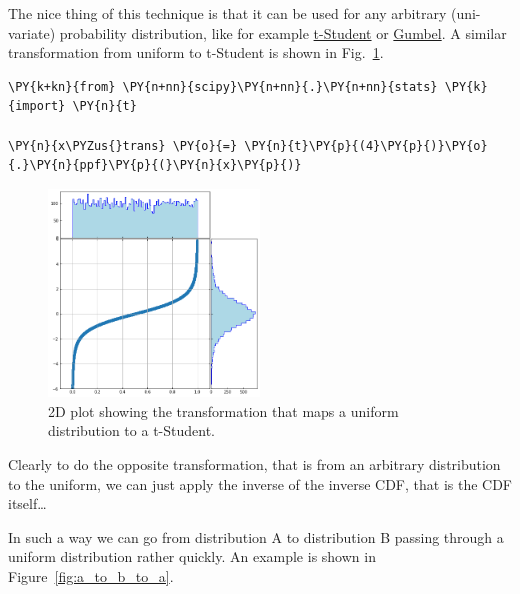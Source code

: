 The nice thing of this technique is that it can be used
for any arbitrary (uni-variate) probability distribution, like for
example \href{https://en.wikipedia.org/wiki/Student\%27s\_t-distribution}{t-Student}
or \href{https://en.wikipedia.org/wiki/Gumbel_distribution}{Gumbel}.
A similar transformation from uniform to t-Student is shown in Fig.~\ref{fig:uniform_to_tstudent}.

\begin{tcolorbox}[breakable, size=fbox, boxrule=1pt, pad at break*=1mm,colback=cellbackground, colframe=cellborder]
\begin{Verbatim}[commandchars=\\\{\}]
\PY{k+kn}{from} \PY{n+nn}{scipy}\PY{n+nn}{.}\PY{n+nn}{stats} \PY{k}{import} \PY{n}{t}

\PY{n}{x\PYZus{}trans} \PY{o}{=} \PY{n}{t}\PY{p}{(4}\PY{p}{)}\PY{o}{.}\PY{n}{ppf}\PY{p}{(}\PY{n}{x}\PY{p}{)}
\end{Verbatim}
\end{tcolorbox}

\begin{figure}[htbp]
  \centering
  \includegraphics[width=0.5\textwidth]{figures/lesson6_9_0.png}
  \caption{2D plot showing the transformation that maps a uniform distribution to a t-Student.}
  \label{fig:uniform_to_tstudent}
\end{figure}

Clearly to do the opposite transformation, that is from an arbitrary distribution
to the uniform, we can just apply the inverse of the inverse CDF, that is the CDF itself\ldots

In such a way we can go from distribution A to distribution B passing through 
a uniform distribution rather quickly. An example is shown in Figure~\ref{fig:a_to_b_to_a}.

